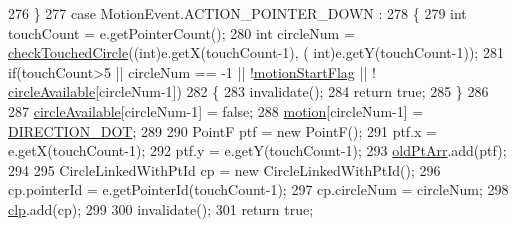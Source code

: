 \begin{DoxyCode}
276                     \}
277                     \textcolor{keywordflow}{case} MotionEvent.ACTION\_POINTER\_DOWN :
278                     \{
279                         \textcolor{keywordtype}{int} touchCount = e.getPointerCount();
280                         \textcolor{keywordtype}{int} circleNum = \hyperlink{classcom_1_1example_1_1multitouchsample_1_1_main_activity_1_1_my_view_a98456bf5be1085790b22ea0179fa2892}{checkTouchedCircle}((\textcolor{keywordtype}{int})e.getX(touchCount-1), (
      int)e.getY(touchCount-1));
281                         \textcolor{keywordflow}{if}(touchCount>5 || circleNum == -1 || !\hyperlink{classcom_1_1example_1_1multitouchsample_1_1_main_activity_1_1_my_view_ab1da26ed65817fe5db4d0be4892ac4b2}{motionStartFlag} || !
      \hyperlink{classcom_1_1example_1_1multitouchsample_1_1_main_activity_1_1_my_view_a5df7070a08705a7a8d8aa00a906fa767}{circleAvailable}[circleNum-1])
282                         \{
283                             invalidate();
284                             \textcolor{keywordflow}{return} \textcolor{keyword}{true};
285                         \}
286                                                     
287                         \hyperlink{classcom_1_1example_1_1multitouchsample_1_1_main_activity_1_1_my_view_a5df7070a08705a7a8d8aa00a906fa767}{circleAvailable}[circleNum-1] = \textcolor{keyword}{false};
288                         \hyperlink{classcom_1_1example_1_1multitouchsample_1_1_main_activity_1_1_my_view_a3e8186596771c2fae1397b496be41230}{motion}[circleNum-1] = \hyperlink{classcom_1_1example_1_1multitouchsample_1_1_main_activity_1_1_my_view_ad91938a7ac9667ccd247a072f338a2de}{DIRECTION\_DOT};
289                         
290                         PointF ptf = \textcolor{keyword}{new} PointF();
291                         ptf.x = e.getX(touchCount-1);
292                         ptf.y = e.getY(touchCount-1);
293                         \hyperlink{classcom_1_1example_1_1multitouchsample_1_1_main_activity_1_1_my_view_abf78b5272ae2cffeed639bd024d2a642}{oldPtArr}.add(ptf);
294 
295                         CircleLinkedWithPtId cp = \textcolor{keyword}{new} CircleLinkedWithPtId();
296                         cp.pointerId = e.getPointerId(touchCount-1);
297                         cp.circleNum = circleNum;
298                         \hyperlink{classcom_1_1example_1_1multitouchsample_1_1_main_activity_1_1_my_view_a3bbc2d3fe569814080fe27c6c64eca77}{clp}.add(cp);
299                         
300                         invalidate();
301                         \textcolor{keywordflow}{return} \textcolor{keyword}{true};

\end{DoxyCode}
